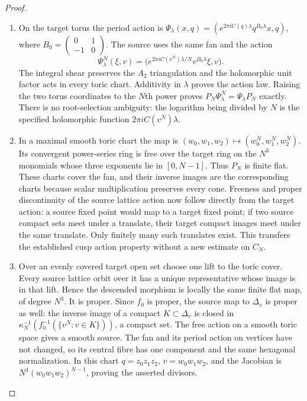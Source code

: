 \begin{proof}
\begin{enumerate}[label=\arabic*.,leftmargin=*]
\item On the target torus the period action is
$\Psi_\lambda(x,q)=(e^{2\pi iC(q)\lambda}q^{B_0\lambda}x,q)$,
where $B_0=\left(\begin{smallmatrix}0&1\\-1&0\end{smallmatrix}\right)$.
The source uses the same fan and the action
\[
 \Psi^N_\lambda(\xi,v)=
 \big(e^{2\pi iC(v^N)\lambda/N}v^{B_0\lambda}\xi,v\big).
\]
The integral shear preserves the $A_2$ triangulation and the
holomorphic unit factor acts in every toric chart. Additivity in $\lambda$
proves the action law. Raising the two torus coordinates to the $N$th
power proves $P_N\Psi^N_\lambda=\Psi_\lambda P_N$ exactly.
There is no root-selection ambiguity: the logarithm being divided by $N$
is the specified holomorphic function $2\pi iC(v^N)\lambda$.

\item In a maximal smooth toric chart the map is
$(w_0,w_1,w_2)\mapsto(w_0^N,w_1^N,w_2^N)$. Its convergent power-series
ring is free over the target ring on the $N^3$ monomials whose three
exponents lie in $[0,N-1]$. Thus $P_N$ is finite flat. These charts cover
the fan, and their inverse images are the corresponding charts because
scalar multiplication preserves every cone. Freeness and proper
discontinuity of the source lattice action now follow directly from the
target action: a source fixed point would map to a target fixed point;
if two source compact sets meet under a translate, their target compact
images meet under the same translate. Only finitely many such translates
exist. This transfers the established cusp action property without a new
estimate on $C_N$.

\item Over an evenly covered target open set choose one lift to the toric
cover. Every source lattice orbit over it has a unique representative
whose image is in that lift. Hence the descended morphism is locally the
same finite flat map, of degree $N^3$. It is proper. Since $f_0$ is proper,
the source map to $\Delta_v$ is proper as well: the inverse image of a
compact $K\subset\Delta_v$ is closed in
$\kappa_N^{-1}(f_0^{-1}(\{v^N:v\in K\}))$, a compact set.
The free action on a smooth toric space gives a smooth source. The fan and
its period action on vertices have not changed, so its central fibre has
one component and the same hexagonal normalization. In this chart
$q=z_0z_1z_2$, $v=w_0w_1w_2$, and the Jacobian is
$N^3(w_0w_1w_2)^{N-1}$, proving the asserted divisors.


\end{enumerate}
\end{proof}
